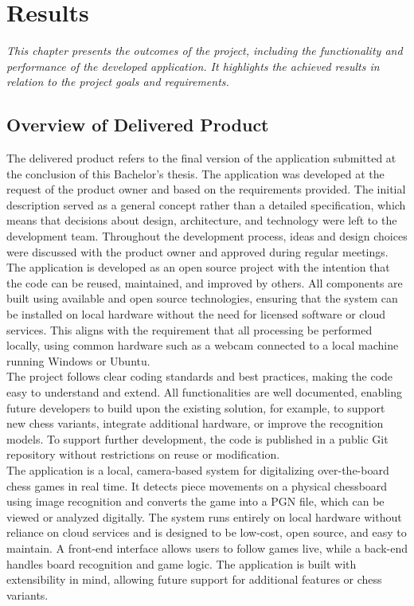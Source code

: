 \chapter{Results}

\begin{center}
    \textit{This chapter presents the outcomes of the project, including the functionality and performance of the developed application. It highlights the achieved results in relation to the project goals and requirements.}
\end{center}

\section{Overview of Delivered Product}
The delivered product refers to the final version of the application submitted at the conclusion of this Bachelor’s thesis. The application was developed at the request of the product owner and based on the requirements provided. The initial description served as a general concept rather than a detailed specification, which means that decisions about design, architecture, and technology were left to the development team. Throughout the development process, ideas and design choices were discussed with the product owner and approved during regular meetings. \\

The application is developed as an open source project with the intention that the code can be reused, maintained, and improved by others. All components are built using available and open source technologies, ensuring that the system can be installed on local hardware without the need for licensed software or cloud services. This aligns with the requirement that all processing be performed locally, using common hardware such as a webcam connected to a local machine running Windows or Ubuntu. \\

The project follows clear coding standards and best practices, making the code easy to understand and extend. All functionalities are well documented, enabling future developers to build upon the existing solution, for example, to support new chess variants, integrate additional hardware, or improve the recognition models. To support further development, the code is published in a public Git repository without restrictions on reuse or modification. \\

The application is a local, camera-based system for digitalizing over-the-board chess games in real time. It detects piece movements on a physical chessboard using image recognition and converts the game into a PGN file, which can be viewed or analyzed digitally. The system runs entirely on local hardware without reliance on cloud services and is designed to be low-cost, open source, and easy to maintain. A front-end interface allows users to follow games live, while a back-end handles board recognition and game logic. The application is built with extensibility in mind, allowing future support for additional features or chess variants.

